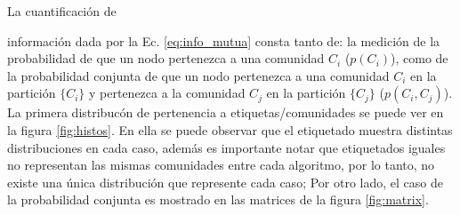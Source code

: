 
La cuantificaci\'on de {informaci\'on dada por la Ec. \ref{eq:info_mutua} 
consta tanto de: la medici\'on de la probabilidad de que un nodo pertenezca
a una comunidad $C_i$ ($p(C_i)$), como de la probabilidad conjunta de que un
nodo pertenezca a una comunidad $C_i$ en la partici\'on $\{C_i\}$ y pertenezca
a la comunidad $C_j$ en la partici\'on $\{C_j\}$ ($p(C_i,C_j)$). La primera
distribuc\'on de pertenencia a etiquetas/comunidades se puede ver en la 
figura \ref{fig:histos}. En ella se puede observar que el etiquetado muestra 
distintas distribuciones en cada caso, adem\'as es importante notar que 
etiquetados iguales no representan las mismas comunidades entre cada algoritmo,
por lo tanto, no existe una \'unica distribuci\'on que represente cada caso;
Por otro lado, el caso de la probabilidad
conjunta es mostrado en las matrices de la figura \ref{fig:matrix}.


}

